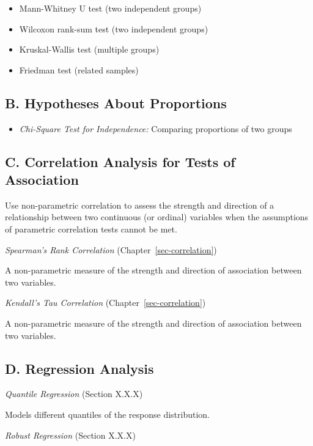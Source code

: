 \documentclass[
  letterpaper,
]{book}
\providecommand{\tightlist}{%
  \setlength{\itemsep}{0pt}\setlength{\parskip}{0pt}}\usepackage{longtable,booktabs,array}
\begin{document}
\begin{itemize}
\tightlist
\item
  Mann-Whitney U test (two independent groups)
\item
  Wilcoxon rank-sum test (two independent groups)
\item
  Kruskal-Wallis test (multiple groups)
\item
  Friedman test (related samples)
\end{itemize}

\subsection{B. Hypotheses About
Proportions}\label{b.-hypotheses-about-proportions}

\begin{itemize}
\tightlist
\item
  \emph{Chi-Square Test for Independence:} Comparing proportions of two
  groups
\end{itemize}

\subsection{C. Correlation Analysis for Tests of
Association}\label{c.-correlation-analysis-for-tests-of-association}

Use non-parametric correlation to assess the strength and direction of a
relationship between two continuous (or ordinal) variables when the
assumptions of parametric correlation tests cannot be met.

\emph{Spearman's Rank Correlation} (Chapter~\ref{sec-correlation})

A non-parametric measure of the strength and direction of association
between two variables.

\emph{Kendall's Tau Correlation} (Chapter~\ref{sec-correlation})

A non-parametric measure of the strength and direction of association
between two variables.

\subsection{D. Regression Analysis}\label{d.-regression-analysis}

\emph{Quantile Regression} (Section X.X.X)

Models different quantiles of the response distribution.

\emph{Robust Regression} (Section X.X.X)
\end{document}
